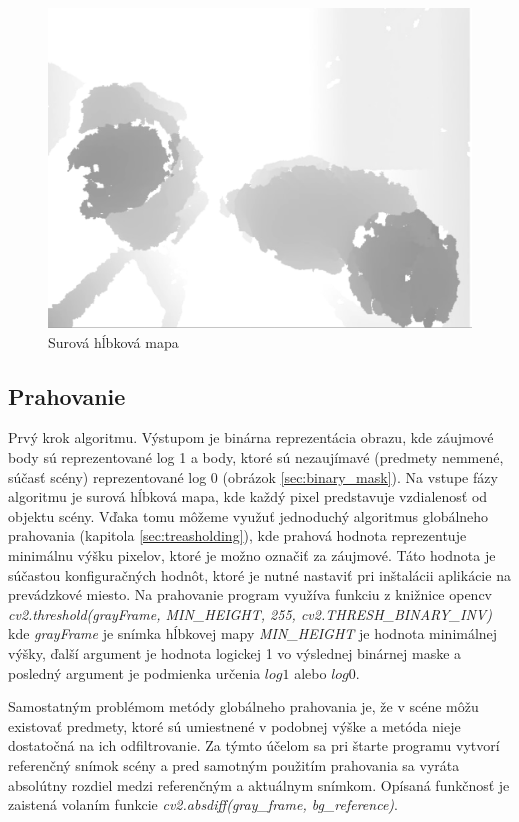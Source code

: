 \begin{figure}[H]
\begin{center}
	\includegraphics[scale=0.30]{images/deepImage}
	\caption{Surová hĺbková mapa}
	\label{sec:deep_image}
	\end{center}
\end{figure}



\subsection{Prahovanie}
\label{sec:imp_treashold}
Prvý krok algoritmu. Výstupom je binárna reprezentácia obrazu, kde záujmové body sú reprezentované log 1 a body, ktoré sú nezaujímavé (predmety nemmené, súčasť scény) reprezentované log 0 (obrázok \ref{sec:binary_mask}). Na vstupe fázy algoritmu je surová hĺbková mapa, kde každý pixel predstavuje vzdialenosť od objektu scény. Vďaka tomu môžeme využuť jednoduchý algoritmus globálneho prahovania (kapitola \ref{sec:treasholding}), kde prahová hodnota reprezentuje minimálnu výšku pixelov, ktoré je možno označiť za záujmové. Táto hodnota je súčastou konfiguračných hodnôt, ktoré je nutné nastaviť pri inštalácii aplikácie na prevádzkové miesto. Na prahovanie program využíva funkciu z knižnice opencv \textit{cv2.threshold(grayFrame, MIN\_HEIGHT, 255, cv2.THRESH\_BINARY\_INV)} kde \textit{grayFrame} je snímka hĺbkovej mapy \textit{MIN\_HEIGHT} je hodnota minimálnej výšky, ďalší argument je hodnota logickej 1 vo výslednej binárnej maske a posledný argument je podmienka určenia $log 1$ alebo $log 0$.

Samostatným problémom metódy globálneho prahovania je, že v scéne môžu existovať predmety, ktoré sú umiestnené v podobnej výške a metóda nieje dostatočná na ich  odfiltrovanie. Za týmto účelom sa pri štarte programu vytvorí referenčný snímok scény a pred samotným použitím prahovania sa vyráta absolútny rozdiel medzi referenčným a aktuálnym snímkom. Opísaná funkčnosť je zaistená volaním funkcie \textit{cv2.absdiff(gray\_frame, bg\_reference)}.



